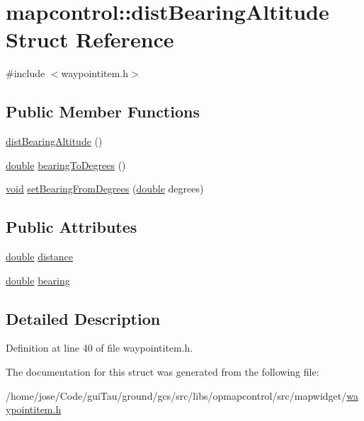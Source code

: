 \hypertarget{structmapcontrol_1_1dist_bearing_altitude}{\section{mapcontrol\-:\-:dist\-Bearing\-Altitude Struct Reference}
\label{structmapcontrol_1_1dist_bearing_altitude}
}


{\ttfamily \#include $<$waypointitem.\-h$>$}

\subsection*{Public Member Functions}
\begin{DoxyCompactItemize}
\item 
\hyperlink{group___o_p_map_widget_ga0ccea3ba9da45c99f65b815917fe7e31}{dist\-Bearing\-Altitude} ()
\item 
\hyperlink{_super_l_u_support_8h_a8956b2b9f49bf918deed98379d159ca7}{double} \hyperlink{group___o_p_map_widget_ga6c6805690915c378c1d294ebf621a7cf}{bearing\-To\-Degrees} ()
\item 
\hyperlink{group___u_a_v_objects_plugin_ga444cf2ff3f0ecbe028adce838d373f5c}{void} \hyperlink{group___o_p_map_widget_gacf717a0d69700f372c04dcee7f550dea}{set\-Bearing\-From\-Degrees} (\hyperlink{_super_l_u_support_8h_a8956b2b9f49bf918deed98379d159ca7}{double} degrees)
\end{DoxyCompactItemize}
\subsection*{Public Attributes}
\begin{DoxyCompactItemize}
\item 
\hyperlink{_super_l_u_support_8h_a8956b2b9f49bf918deed98379d159ca7}{double} \hyperlink{group___o_p_map_widget_ga4f3ed7668339c6c63a158fe42d69f8ee}{distance}
\item 
\hyperlink{_super_l_u_support_8h_a8956b2b9f49bf918deed98379d159ca7}{double} \hyperlink{group___o_p_map_widget_ga473dc356430fb4d398c78d0fdde33ad1}{bearing}
\end{DoxyCompactItemize}


\subsection{Detailed Description}


Definition at line 40 of file waypointitem.\-h.



The documentation for this struct was generated from the following file\-:\begin{DoxyCompactItemize}
\item 
/home/jose/\-Code/gui\-Tau/ground/gcs/src/libs/opmapcontrol/src/mapwidget/\hyperlink{waypointitem_8h}{waypointitem.\-h}\end{DoxyCompactItemize}
